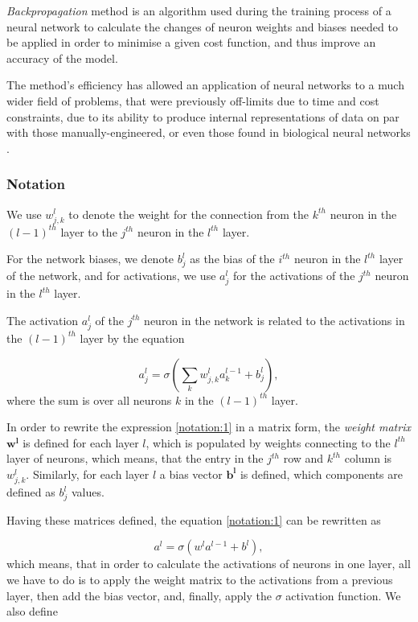 \emph{Backpropagation} method is an algorithm used during the training process of a neural network to calculate the changes of neuron weights and biases needed to be applied in order to minimise a given cost function, and thus improve an accuracy of the model.

The method's efficiency has allowed an application of neural networks to a much wider field of problems, that were previously off-limits due to time and cost constraints, due to its ability to produce internal representations of data on par with those manually-engineered, or even those found in biological neural networks \cite{backpropagation_brilliant}.

\subsubsection{Notation}

We use $w_{j, k}^l$ to denote the weight for the connection from the $k^{th}$ neuron in the $(l-1)^{th}$ layer to the $j^{th}$ neuron in the $l^{th}$ layer.

For the network biases, we denote $b_j^l$ as the bias of the $i^{th}$ neuron in the $l^{th}$ layer of the network, and for activations, we use $a_j^l$ for the activations of the $j^{th}$ neuron in the $l^{th}$ layer.

The activation $a_j^l$ of the $j^{th}$ neuron in the network is related to the activations in the $(l-1)^{th}$ layer by the equation

\begin{equation}
\label{notation:1}
a_j^l = \sigma(\sum_k w^l_{j, k}a^{l-1}_k + b_j^l),
\end{equation}
where the sum is over all neurons $k$ in the $(l-1)^{th}$ layer. 

In order to rewrite the expression \ref{notation:1} in a matrix form, the \emph{weight matrix} $\boldsymbol{w^l}$ is defined for each layer $l$, which is populated by weights connecting to the $l^{th}$ layer of neurons, which means, that the entry in the $j^{th}$ row and $k^{th}$ column is $w_{j, k}^l$. Similarly, for each layer $l$ a bias vector $\boldsymbol{b^l}$ is defined, which components are defined as $b^l_j$ values.

Having these matrices defined, the equation \ref{notation:1} can be rewritten as

\begin{equation}
\label{notation:2}
a^l = \sigma(w^la^{l-1}+b^l),
\end{equation}
which means, that in order to calculate the activations of neurons in one layer, all we have to do is to apply the weight matrix to the activations from a previous layer, then add the bias vector, and, finally, apply the $\sigma$ activation function. We also define

